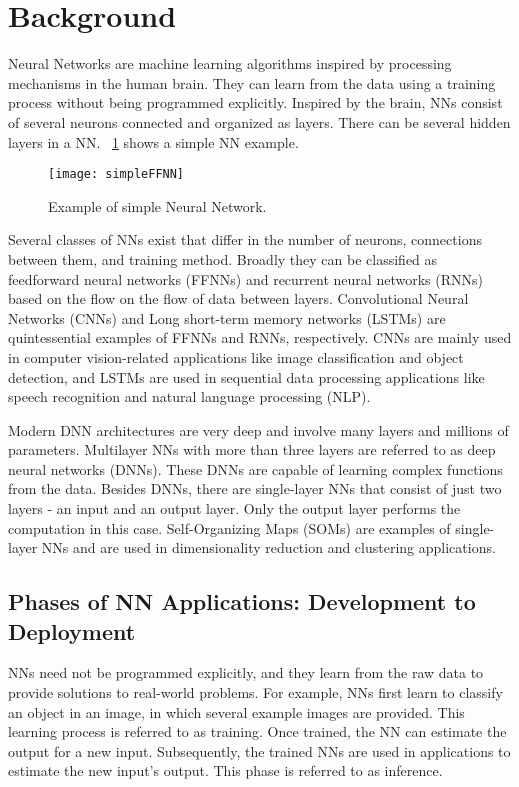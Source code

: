 \section{Background}
Neural Networks are machine learning algorithms inspired by processing mechanisms in the human brain. They can learn from the data using a training process without being programmed explicitly. Inspired by the brain, NNs consist of several neurons connected and organized as layers. There can be several hidden layers in a NN. \figurename{~\ref{fig:simpleNN}} shows a simple NN example. 
\begin{figure}[!htb]
	\centering
	\captionsetup{font=sf}
	\texttt{[image: simpleFFNN]}
	\caption{Example of simple Neural Network.}
	\label{fig:simpleNN}
\end{figure}

Several classes of NNs exist that differ in the number of neurons, connections between them, and training method. Broadly they can be classified as feedforward neural networks (FFNNs) and recurrent neural networks (RNNs) based on the flow on the flow of data between layers. Convolutional Neural Networks (CNNs) and Long short-term memory networks (LSTMs) are quintessential examples of FFNNs and RNNs, respectively. CNNs are mainly used in computer vision-related applications like image classification and object detection, and LSTMs are used in sequential data processing applications like speech recognition and natural language processing (NLP). 

Modern DNN architectures are very deep and involve many layers and millions of parameters. 
Multilayer NNs with more than three layers are referred to as deep neural networks (DNNs). These DNNs are capable of learning complex functions from the data. Besides DNNs, there are single-layer NNs that consist of just two layers - an input and an output layer. Only the output layer performs the computation in this case. Self-Organizing Maps (SOMs) are examples of single-layer NNs and are used in dimensionality reduction and clustering applications. 

\subsection{Phases of NN Applications: Development to Deployment}
NNs need not be programmed explicitly, and they learn from the raw data to provide solutions to real-world problems. For example, NNs first learn to classify an object in an image, in which several example images are provided. This learning process is referred to as training. Once trained, the NN can estimate the output for a new input. Subsequently, the trained NNs are used in applications to estimate the new input's output. This phase is referred to as inference.

